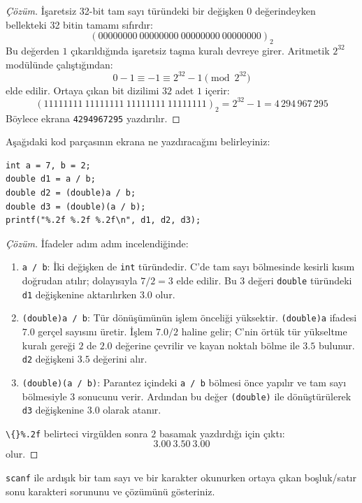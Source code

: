 \begin{proof}[Çözüm]
İşaretsiz 32-bit tam sayı türündeki bir değişken $0$ değerindeyken bellekteki 32 bitin tamamı sıfırdır:
\[
(00000000\ 00000000\ 00000000\ 00000000)_2
\]
Bu değerden $1$ çıkarıldığında işaretsiz taşma kuralı devreye girer. Aritmetik $2^{32}$ modülünde çalıştığından:
\[
0 - 1 \equiv -1 \equiv 2^{32} - 1 \pmod{2^{32}}
\]
elde edilir. Ortaya çıkan bit dizilimi $32$ adet $1$ içerir:
\[
(11111111\ 11111111\ 11111111\ 11111111)_2 = 2^{32} - 1 = 4\,294\,967\,295
\]
Böylece ekrana \texttt{4294967295} yazdırılır.
\end{proof}

\begin{example}
Aşağıdaki kod parçasının ekrana ne yazdıracağını belirleyiniz:
\begin{lstlisting}[language=CTemel]
int a = 7, b = 2;
double d1 = a / b;
double d2 = (double)a / b;
double d3 = (double)(a / b);
printf("%.2f %.2f %.2f\n", d1, d2, d3);
\end{lstlisting}
\end{example}

\begin{proof}[Çözüm]
İfadeler adım adım incelendiğinde:
\begin{enumerate}
    \item \texttt{a / b}: İki değişken de \texttt{int} türündedir. C'de tam sayı bölmesinde kesirli kısım doğrudan atılır; dolayısıyla $7 / 2 = 3$ elde edilir. Bu $3$ değeri \texttt{double} türündeki \texttt{d1} değişkenine aktarılırken $3.0$ olur.
    \item \texttt{(double)a / b}: Tür dönüşümünün işlem önceliği yüksektir. \texttt{(double)a} ifadesi $7.0$ gerçel sayısını üretir. İşlem $7.0 / 2$ haline gelir; C'nin örtük tür yükseltme kuralı gereği $2$ de $2.0$ değerine çevrilir ve kayan noktalı bölme ile $3.5$ bulunur. \texttt{d2} değişkeni $3.5$ değerini alır.
    \item \texttt{(double)(a / b)}: Parantez içindeki \texttt{a / b} bölmesi önce yapılır ve tam sayı bölmesiyle $3$ sonucunu verir. Ardından bu değer \texttt{(double)} ile dönüştürülerek \texttt{d3} değişkenine $3.0$ olarak atanır.
\end{enumerate}
\texttt{\textbackslash\{\}\%.2f} belirteci virgülden sonra $2$ basamak yazdırdığı için çıktı:
\[
3.00\ 3.50\ 3.00
\]
olur.
\end{proof}

\begin{example}
\texttt{scanf} ile ardışık bir tam sayı ve bir karakter okunurken ortaya çıkan boşluk/satır sonu karakteri sorununu ve çözümünü gösteriniz.
\end{example}

